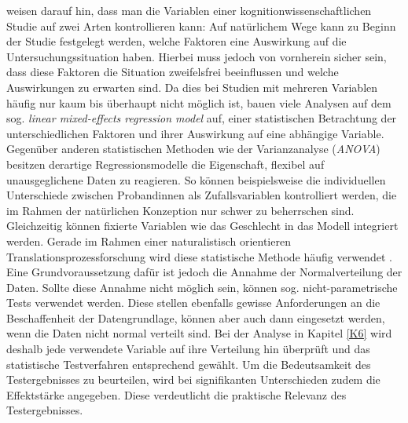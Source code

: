 \begin{sloppypar}
\citet[25]{jakobsen_reading_2017} weisen darauf hin, dass man die Variablen einer kognitionwissenschaftlichen Studie auf zwei Arten kontrollieren kann: Auf natürlichem Wege kann zu Beginn der Studie festgelegt werden, welche Faktoren eine Auswirkung auf die Untersuchungssituation haben. Hierbei muss jedoch von vornherein sicher sein, dass diese Faktoren die Situation zweifelsfrei beeinflussen und welche Auswirkungen zu erwarten sind. Da dies bei Studien mit mehreren Variablen häufig nur kaum bis überhaupt nicht möglich ist, bauen viele Analysen auf dem sog. \emph{linear mixed-effects regression model} auf, einer statistischen Betrachtung der unterschiedlichen Faktoren und ihrer Auswirkung auf eine abhängige Variable. Gegenüber anderen statistischen Methoden wie der Varianzanalyse (\emph{ANOVA}) besitzen derartige Regressionsmodelle die Eigenschaft, flexibel auf unausgeglichene Daten zu reagieren. So können beispielsweise die individuellen Unterschiede zwischen Proband{\textperiodcentered}innen als Zufallsvariablen kontrolliert werden, die im Rahmen der natürlichen Konzeption nur schwer zu beherrschen sind. Gleichzeitig können fixierte Variablen wie das Geschlecht in das Modell integriert werden. Gerade im Rahmen einer naturalistisch orientieren Translationsprozessforschung wird diese statistische Methode häufig verwendet \citep[vgl.\,z.\,B.][]{jakobsen_reading_2017, jakobsen_chapter_2017}. Eine Grundvoraussetzung dafür ist jedoch die Annahme der Normalverteilung der Daten. Sollte diese Annahme nicht möglich sein, können sog. nicht-parametrische Tests verwendet werden. Diese stellen ebenfalls gewisse Anforderungen an die Beschaffenheit der Datengrundlage, können aber auch dann eingesetzt werden, wenn die Daten nicht normal verteilt sind. Bei der Analyse in Kapitel \ref{K6} wird deshalb jede verwendete Variable auf ihre Verteilung hin überprüft und das statistische Testverfahren entsprechend gewählt. Um die Bedeutsamkeit des Testergebnisses zu beurteilen, wird bei signifikanten Unterschieden zudem die Effektstärke angegeben. Diese verdeutlicht die praktische Relevanz des Testergebnisses.\end{sloppypar}

